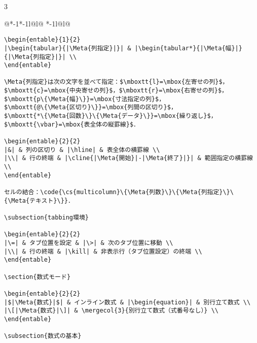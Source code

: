 \documentclass[10pt,a4paper,landscape,dvipdfmx,nomag]{jsarticle}
\makeatletter
\def\set@etsep#1#2{\def\etcolsep{#1}\def\etitemsep{#2}}
\newenvironment{entable}[3][\quad\qquad]{%
  \set@etsep#1\relax\relax
  \begin{tabular}{%
    @{}*{\the\numexpr#3-1}{*{\the\numexpr#2-1}{l@{\etcolsep}}l@{\etitemsep}}%
    *{\the\numexpr#2-1}{l@{\etcolsep}}l@{}}}{%
  \end{tabular}}
\newcommand{\mergecol}[2]{\multicolumn{#1}{@{}l@{}}{#2}}
\newcommand*\eghostguarded{%
  \ifmmode \expandafter\@firstofone
  \else \expandafter\pxqgg@eghostguarded@a
  \fi}
\def\pxqgg@eghostguarded@a#1{%
  {\pxqgg@TI\pxqgg@cwm}%
  #1%
  {\pxqgg@TI\pxqgg@cwm}}
\newcommand{\codefont}{\ttfamily\gtfamily}
\newcommand{\cs}[1]{\eghostguarded{{\codefont \bs #1}}}
\newcommand{\code}[1]{\eghostguarded{{\codefont #1}}}
\newcommand{\mboxtt}[1]{\mbox{\texttt{#1}}}
\newcommand{\Meta}[1]{$\langle$\mbox{}\emph{#1}\mbox{}$\rangle$}
\makeatother
\begin{document}
\begin{multicols}{3}
\begin{entable}[\enspace]{2}{1}
\begin{verbatim}
\begin{entable}{1}{2}
|\begin{tabular}{|\Meta{列指定}|}| & |\begin{tabular*}{|\Meta{幅}|}{|\Meta{列指定}|}| \\
\end{entable}

\Meta{列指定}は次の文字を並べて指定：$\mboxtt{l}=\mbox{左寄せの列}$，
$\mboxtt{c}=\mbox{中央寄せの列}$，$\mboxtt{r}=\mbox{右寄せの列}$，
$\mboxtt{p\{\Meta{幅}\}}=\mbox{寸法指定の列}$，
$\mboxtt{@\{\Meta{区切り}\}}=\mbox{列間の区切り}$，
$\mboxtt{*\{\Meta{回数}\}\{\Meta{データ}\}}=\mbox{繰り返し}$，
$\mboxtt{\vbar}=\mbox{表全体の縦罫線}$．

\begin{entable}{2}{2}
|&| & 列の区切り & |\hline| & 表全体の横罫線 \\
|\\| & 行の終端 & |\cline{|\Meta{開始}|-|\Meta{終了}|}| & 範囲指定の横罫線 \\
\end{entable}

セルの結合：\code{\cs{multicolumn}\{\Meta{列数}\}\{\Meta{列指定}\}\{\Meta{テキスト}\}}．

\subsection{tabbing環境}

\begin{entable}{2}{2}
|\=| & タブ位置を設定 & |\>| & 次のタブ位置に移動 \\
|\\| & 行の終端 & |\kill| & 非表示行（タブ位置設定）の終端 \\
\end{entable}

\section{数式モード}

\begin{entable}{2}{2}
|$|\Meta{数式}|$| & インライン数式 & |\begin{equation}| & 別行立て数式 \\
|\[|\Meta{数式}|\]| & \mergecol{3}{別行立て数式（式番号なし）} \\
\end{entable}

\subsection{数式の基本}


\end{verbatim}
\end{entable}
\end{multicols}
\end{document}

